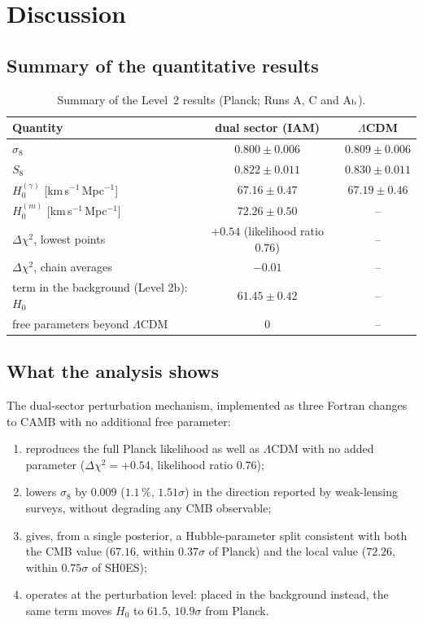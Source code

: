 \section{Discussion}\label{sec:l2_discussion}
\subsection{Summary of the quantitative results}
\begin{table}[htbp]\centering\small
\caption{Summary of the Level~2 results (Planck; Runs A, C and A$_{\rm b}$). \measured}\label{tab:l2_summary}
\begin{tabularx}{\linewidth}{>{\raggedright\arraybackslash}Xcc}\hline
Quantity & dual sector (IAM) & $\Lambda$CDM\\\hline
$\sigma_8$ & $0.800\pm0.006$ & $0.809\pm0.006$\\
$S_8$ & $0.822\pm0.011$ & $0.830\pm0.011$\\
$H_0^{(\gamma)}$ [km\,s$^{-1}$\,Mpc$^{-1}$] & $67.16\pm0.47$ & $67.19\pm0.46$\\
$H_0^{(m)}$ [km\,s$^{-1}$\,Mpc$^{-1}$] & $72.26\pm0.50$ & --\\
$\Delta\chi^2$, lowest points & $+0.54$ (likelihood ratio $0.76$) & --\\
$\Delta\chi^2$, chain averages & $-0.01$ & --\\
term in the background (Level 2b): $H_0$ & $61.45\pm0.42$ & --\\
free parameters beyond $\Lambda$CDM & 0 & --\\\hline
\end{tabularx}\end{table}

\subsection{What the analysis shows}
The dual-sector perturbation mechanism, implemented as three Fortran changes to CAMB with no additional free parameter:
\begin{enumerate}
\item reproduces the full Planck likelihood as well as $\Lambda$CDM with no added parameter ($\Delta\chi^2=+0.54$, likelihood ratio $0.76$);
\item lowers $\sigma_8$ by $0.009$ ($1.1\,\%$, $1.51\sigma$) in the direction reported by weak-lensing surveys, without degrading any CMB observable;
\item gives, from a single posterior, a Hubble-parameter split consistent with both the CMB value ($67.16$, within $0.37\sigma$ of Planck) and the
local value ($72.26$, within $0.75\sigma$ of SH0ES);
\item operates at the perturbation level: placed in the background instead, the same term moves $H_0$ to $61.5$, $10.9\sigma$ from Planck.
\end{enumerate}

